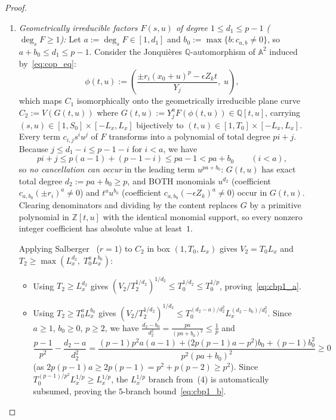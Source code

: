 \documentclass[11pt,a4paper]{amsart}
\theoremstyle{plain}
\theoremstyle{definition}
\theoremstyle{remark}
\newcommand{\Z}{\mathbb{Z}}
\newcommand{\Q}{\mathbb{Q}}
\newcommand{\AAff}{\mathbb{A}}
\begin{document}
\begin{proof}
\begin{enumerate}[label=(\arabic*),itemsep=2pt]
\[
  N(C_1; 1, S_0, L_x) \ll_{p,\eta} \max(S_0, L_x)^{1/p} \log X + 1.
\]
\item \emph{Geometrically irreducible factors $F(s, u)$ of degree $1 \le d_1 \le p - 1$ ($\deg_s F \ge 1$):} Let $a := \deg_s F \in [1, d_1]$ and $b_0 := \max\{b : c_{a,b} \neq 0\}$, so $a + b_0 \le d_1 \le p - 1$. Consider the Jonqui\`eres $\Q$-automorphism of $\AAff^2$ induced by~\eqref{eq:cop_eq}:
\[
  \phi(t, u) := \left(\frac{\pm r_i (x_0 + u)^p - \epsilon Z_k t}{Y_j},\; u\right),
\]
which maps $C_1$ isomorphically onto the geometrically irreducible plane curve $C_2 := V(G(t, u))$ where $G(t, u) := Y_j^a F(\phi(t, u)) \in \Q[t, u]$, carrying $(s, u) \in [1, S_0] \times [-L_x, L_x]$ bijectively to $(t, u) \in [1, T_0] \times [-L_x, L_x]$. Every term $c_{i,j} s^i u^j$ of $F$ transforms into a polynomial of total degree $p i + j$. Because $j \le d_1 - i \le p - 1 - i$ for $i < a$, we have
\[
  p i + j \le p(a - 1) + (p - 1 - i) \le p a - 1 < p a + b_0 \qquad (i < a),
\]
so \emph{no cancellation can occur} in the leading term $u^{pa+b_0}$: $G(t, u)$ has exact total degree $d_2 := p a + b_0 \ge p$, and BOTH monomials $u^{d_2}$ (coefficient $c_{a,b_0}(\pm r_i)^a \neq 0$) and $t^a u^{b_0}$ (coefficient $c_{a,b_0}(-\epsilon Z_k)^a \neq 0$) occur in $G(t, u)$. Clearing denominators and dividing by the content replaces $G$ by a primitive polynomial in $\Z[t, u]$ with the identical monomial support, so every nonzero integer coefficient has absolute value at least~$1$.

Applying Salberger~\cite[Theorem~1.2]{Salberger2023} ($r=1$) to $C_2$ in box $(1, T_0, L_x)$ gives $V_2 = T_0 L_x$ and $T_2 \ge \max(L_x^{d_2},\; T_0^a L_x^{b_0})$:
\begin{itemize}[itemsep=1pt]
\item Using $T_2 \ge L_x^{d_2}$ gives $(V_2 / T_2^{1/d_2})^{1/d_2} \le T_0^{1/d_2} \le T_0^{1/p}$, proving~\eqref{eq:cbp1_a}.
\item Using $T_2 \ge T_0^a L_x^{b_0}$ gives $(V_2 / T_2^{1/d_2})^{1/d_2} \le T_0^{(d_2 - a)/d_2^2} L_x^{(d_2 - b_0)/d_2^2}$. Since $a \ge 1$, $b_0 \ge 0$, $p \ge 2$, we have $\frac{d_2 - b_0}{d_2^2} = \frac{p a}{(pa+b_0)^2} \le \frac{1}{p}$ and
\[
  \frac{p-1}{p^2} - \frac{d_2 - a}{d_2^2}
  = \frac{(p-1)p^2 a(a-1) + \bigl(2p(p-1)a - p^2\bigr)b_0 + (p-1)b_0^2}{p^2 (pa+b_0)^2} \ge 0
\]
(as $2p(p-1)a \ge 2p(p-1) = p^2 + p(p-2) \ge p^2$). Since $T_0^{(p-1)/p^2} L_x^{1/p} \ge L_x^{1/p}$, the $L_x^{1/p}$ branch from~(4) is automatically subsumed, proving the $5$-branch bound~\eqref{eq:cbp1_b}. \qedhere
\end{itemize}
\end{enumerate}
\end{proof}
\end{document}
